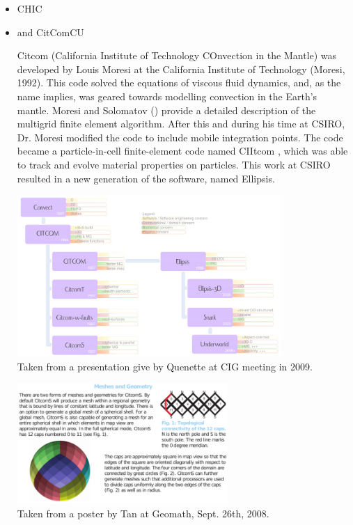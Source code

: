 \begin{itemize}
\item {\codefont CHIC}  

\begin{scriptsize}
\textcite{norv15}
\end{scriptsize}

\item \citcoms and {\codefont CitComCU} 

Citcom (California Institute of Technology COnvection in the Mantle) was  developed by Louis
Moresi at the California Institute of Technology (Moresi, 1992). This code solved the equations
of viscous fluid dynamics, and, as the name implies, was geared towards modelling convection in
the Earth's mantle. Moresi and Solomatov (\nineteenninetyfive) provide a detailed description of the multigrid
finite element algorithm. After this and during his time at CSIRO, Dr. Moresi modified the code to
include mobile integration points. The code became a particle-in-cell finite-element code named
CIItcom , which was able to track and evolve material properties on particles. This work at
CSIRO resulted in a new generation of the software, named Ellipsis.

\begin{center}
\includegraphics[width=10cm]{images/codes/quenette_cig_2009}\\
{\captionfont Taken from a presentation give by Quenette at CIG meeting in 2009.}
\end{center}

\begin{center}
\includegraphics[width=8cm]{images/codes/CitcomS}\\
{\captionfont Taken from a poster by Tan \etal at Geomath, Sept. 26th, 2008.}
\end{center}


\end{itemize}
